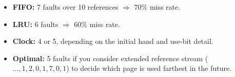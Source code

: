 \documentclass{article}
\begin{document}
\begin{itemize}
  \item \textbf{FIFO:} 7 faults over 10 references $\Rightarrow$ 70\% miss rate.
  \item \textbf{LRU:} 6 faults $\Rightarrow$ 60\% miss rate.
  \item \textbf{Clock:} 4 or 5, depending on the initial hand and use-bit detail.
  \item \textbf{Optimal:} 5 faults if you consider extended reference stream 
        (\( \dots,1,2,0,1,7,0,1 \)) to decide which page is used farthest in the future.
\end{itemize}


\newpage


\end{document}
